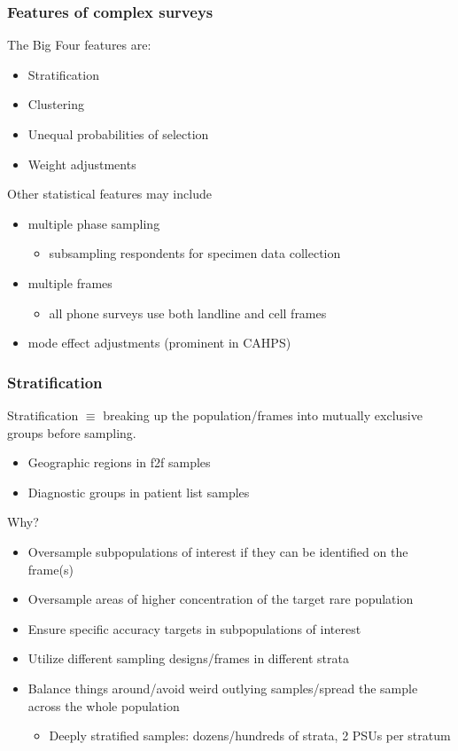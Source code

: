 \documentclass{beamer}
\begin{document}
\begin{frame}\frametitle{Features of complex surveys}

The Big Four features are:

\begin{itemize}
    \item Stratification
    \item Clustering
    \item Unequal probabilities of selection
    \item Weight adjustments
\end{itemize}

Other statistical features may include
\begin{itemize}
    \item multiple phase sampling
        \begin{itemize} \item subsampling respondents for specimen data collection \end{itemize}
    \item multiple frames
        \begin{itemize} \item all phone surveys use both landline and cell frames \end{itemize}
    \item mode effect adjustments (prominent in CAHPS)
\end{itemize}

\end{frame}

\begin{frame}\frametitle{Stratification}

Stratification $\equiv$ breaking up the population/frames into mutually exclusive groups before sampling.
\begin{itemize}
    \item Geographic regions in f2f samples
    \item Diagnostic groups in patient list samples
\end{itemize}

Why?

\begin{itemize}
    \item Oversample subpopulations of interest if they can be identified on the frame(s)
    \item Oversample areas of higher concentration of the target rare population
    \item Ensure specific accuracy targets in subpopulations of interest
    \item Utilize different sampling designs/frames in different strata
    \item Balance things around/avoid weird outlying samples/spread the sample across the whole population
    \begin{itemize} \item Deeply stratified samples: dozens/hundreds of strata, 2 PSUs per stratum \end{itemize}
\end{itemize}



\end{frame}
\end{document}
